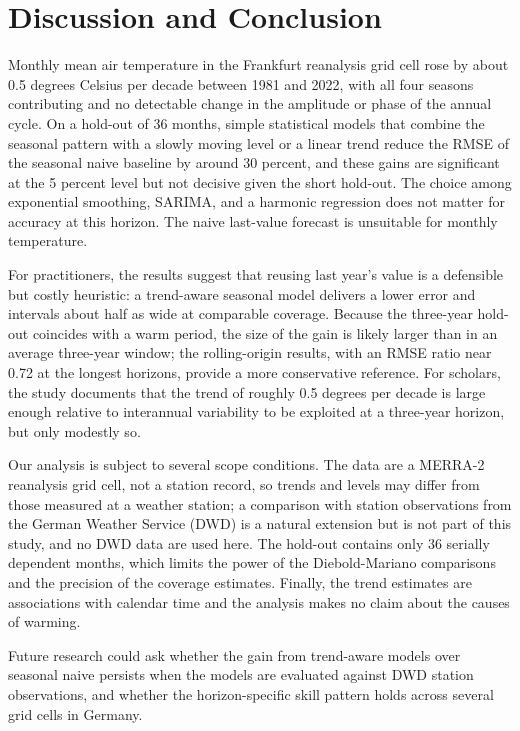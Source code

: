 \section{Discussion and Conclusion}

Monthly mean air temperature in the Frankfurt reanalysis grid cell rose by about 0.5 degrees Celsius per decade between 1981 and 2022, with all four seasons contributing and no detectable change in the amplitude or phase of the annual cycle. On a hold-out of 36 months, simple statistical models that combine the seasonal pattern with a slowly moving level or a linear trend reduce the RMSE of the seasonal naive baseline by around 30 percent, and these gains are significant at the 5 percent level but not decisive given the short hold-out. The choice among exponential smoothing, SARIMA, and a harmonic regression does not matter for accuracy at this horizon. The naive last-value forecast is unsuitable for monthly temperature.

For practitioners, the results suggest that reusing last year's value is a defensible but costly heuristic: a trend-aware seasonal model delivers a lower error and intervals about half as wide at comparable coverage. Because the three-year hold-out coincides with a warm period, the size of the gain is likely larger than in an average three-year window; the rolling-origin results, with an RMSE ratio near 0.72 at the longest horizons, provide a more conservative reference. For scholars, the study documents that the trend of roughly 0.5 degrees per decade is large enough relative to interannual variability to be exploited at a three-year horizon, but only modestly so.

Our analysis is subject to several scope conditions. The data are a MERRA-2 reanalysis grid cell, not a station record, so trends and levels may differ from those measured at a weather station; a comparison with station observations from the German Weather Service (DWD) is a natural extension but is not part of this study, and no DWD data are used here. The hold-out contains only 36 serially dependent months, which limits the power of the Diebold-Mariano comparisons and the precision of the coverage estimates. Finally, the trend estimates are associations with calendar time and the analysis makes no claim about the causes of warming.

Future research could ask whether the gain from trend-aware models over seasonal naive persists when the models are evaluated against DWD station observations, and whether the horizon-specific skill pattern holds across several grid cells in Germany.




